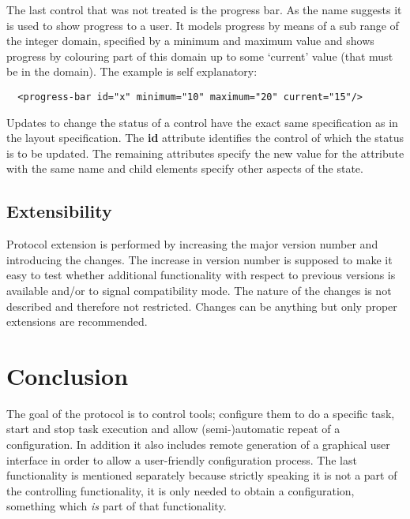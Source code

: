 \documentclass{article}
\begin{document}
   The last control that was not treated is the progress bar. As the name
   suggests it is used to show progress to a user. It models progress by means
   of a sub range of the integer domain, specified by a minimum and maximum
   value and shows progress by colouring part of this domain up to some
   `current' value (that must be in the domain). The example is self
   explanatory:

    \begin{verbatim}
  <progress-bar id="x" minimum="10" maximum="20" current="15"/>\end{verbatim}

   Updates to change the status of a control have the exact same specification
   as in the layout specification. The \textbf{id} attribute identifies the
   control of which the status is to be updated. The remaining attributes
   specify the new value for the attribute with the same name and child
   elements specify other aspects of the state.

  \subsection{Extensibility}

   Protocol extension is performed by increasing the major version number and
   introducing the changes. The increase in version number is supposed to make
   it easy to test whether additional functionality with respect to previous
   versions is available and/or to signal compatibility mode. The nature of the
   changes is not described and therefore not restricted. Changes can be
   anything but only proper extensions are recommended.

  \section{Conclusion}

   The goal of the protocol is to control tools; configure them to do a
   specific task, start and stop task execution and allow (semi-)automatic
   repeat of a configuration. In addition it also includes remote generation of
   a graphical user interface in order to allow a user-friendly configuration
   process. The last functionality is mentioned separately because strictly
   speaking it is not a part of the controlling functionality, it is only
   needed to obtain a configuration, something which \emph{is} part of that
   functionality.
\end{document}
